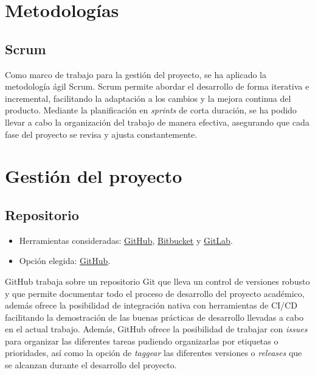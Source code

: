 
\section{Metodologías}\label{metodologias}

\subsection{Scrum}\label{scrum}
Como marco de trabajo para la gestión del proyecto, se ha aplicado la metodología ágil Scrum. Scrum permite abordar el desarrollo de forma iterativa e incremental, facilitando la adaptación a los cambios y la mejora continua del producto. Mediante la planificación en \emph{sprints} de corta duración, se ha podido llevar a cabo la organización del trabajo de manera efectiva, asegurando que cada fase del proyecto se revisa y ajusta constantemente.

\section{Gestión del proyecto}\label{gestion-del-proyecto}

\subsection{Repositorio}\label{repositorio}

\begin{itemize}
\tightlist
\item
  Herramientas consideradas: \href{https://github.com/}{GitHub},
  \href{https://bitbucket.org/}{Bitbucket} y
  \href{https://gitlab.com/}{GitLab}.
\item
  Opción elegida: \href{https://github.com/}{GitHub}.
\end{itemize}

GitHub trabaja sobre un repositorio Git que lleva un control de versiones robusto y que permite documentar todo el proceso de desarrollo del proyecto académico, además ofrece la posibilidad de integración nativa con herramientas de CI/CD facilitando la demostración de las buenas prácticas de desarrollo llevadas a cabo en el actual trabajo.
Además, GitHub ofrece la posibilidad de trabajar con \emph{issues} para organizar las diferentes tareas pudiendo organizarlas por etiquetas o prioridades, así como la opción de \emph{taggear} las diferentes versiones o \emph{releases} que se alcanzan durante el desarrollo del proyecto.

